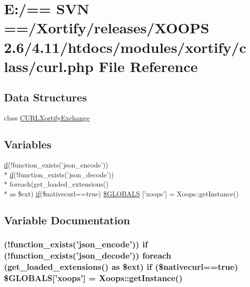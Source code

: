 \hypertarget{curl_8php}{\section{E\-:/== S\-V\-N ==/\-Xortify/releases/\-X\-O\-O\-P\-S 2.6/4.11/htdocs/modules/xortify/class/curl.php File Reference}
\label{curl_8php}
}
\subsection*{Data Structures}
\begin{DoxyCompactItemize}
\item 
class \hyperlink{class_c_u_r_l_xortify_exchange}{C\-U\-R\-L\-Xortify\-Exchange}
\end{DoxyCompactItemize}
\subsection*{Variables}
\begin{DoxyCompactItemize}
\item 
\hyperlink{poll_2index_8php_ae404acbb304be6b6ac443de921697faf}{if}(!function\-\_\-exists('json\-\_\-encode')) \\*
\hyperlink{poll_2index_8php_ae404acbb304be6b6ac443de921697faf}{if}(!function\-\_\-exists('json\-\_\-decode')) \\*
foreach(get\-\_\-loaded\-\_\-extensions() \\*
as \$ext) \hyperlink{poll_2index_8php_ae404acbb304be6b6ac443de921697faf}{if}(\$nativecurl==true) \hyperlink{curl_8php_a8665f154810f15495d0d72726758b563}{\$\-G\-L\-O\-B\-A\-L\-S} \mbox{[}'xoops'\mbox{]} = Xoops\-::get\-Instance()
\end{DoxyCompactItemize}


\subsection{Variable Documentation}
\hypertarget{curl_8php_a8665f154810f15495d0d72726758b563}{
\subsubsection[{\$\-G\-L\-O\-B\-A\-L\-S}]{ (!function\-\_\-exists('json\-\_\-encode')) {\bf if} (!function\-\_\-exists('json\-\_\-decode')) foreach (get\-\_\-loaded\-\_\-extensions() as \$ext) {\bf if} (\$nativecurl==true) \$G\-L\-O\-B\-A\-L\-S\mbox{[}'xoops'\mbox{]} = Xoops\-::get\-Instance()}}\label{curl_8php_a8665f154810f15495d0d72726758b563}
